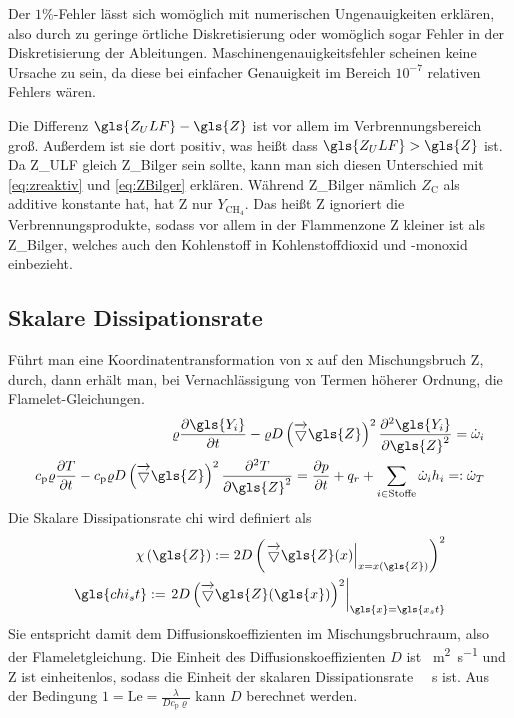 Der $1\%$-Fehler lässt sich womöglich mit numerischen Ungenauigkeiten erklären, also durch zu geringe örtliche Diskretisierung oder womöglich sogar Fehler in der Diskretisierung der Ableitungen. Maschinengenauigkeitsfehler scheinen keine Ursache zu sein, da diese bei einfacher Genauigkeit im Bereich $10^{-7}$ relativen Fehlers wären.

Die Differenz $\gls{Z_ULF} - \gls{Z}$ ist vor allem im Verbrennungsbereich groß. Außerdem ist sie dort positiv, was heißt dass $\gls{Z_ULF} > \gls{Z}$ ist. Da \gls{Z_ULF} gleich \gls{Z_Bilger} sein sollte, kann man sich diesen Unterschied mit \autoref{eq:zreaktiv} und \autoref{eq:ZBilger} erklären. Während \gls{Z_Bilger} nämlich $Z_\mathrm{C}$ als additive konstante hat, hat \gls{Z} nur $Y_{\mathrm{CH}_4}$. Das heißt \gls{Z} ignoriert die Verbrennungsprodukte, sodass vor allem in der Flammenzone \gls{Z} kleiner ist als \gls{Z_Bilger}, welches auch den Kohlenstoff in Kohlenstoffdioxid und -monoxid einbezieht.



\subsection{Skalare Dissipationsrate}
\label{sct:chist}

Führt man eine Koordinatentransformation von \gls{x} auf den Mischungsbruch \gls{Z}, durch, dann erhält man, bei Vernachlässigung von Termen höherer Ordnung, die Flamelet-Gleichungen\cite[16]{hasse-pdf08}\cite[94]{poinsot2005theoretical}.
\begin{align}
    \varrho \fpart{ \gls{Y_i} }{t} -
    \varrho D \left( \nabla\gls{Z} \right)^2
        \frac{ \partial^2 \gls{Y_i}  }{ \partial \gls{Z}^2 }
    = \dot{\omega}_i \\
    c_\mathrm{p} \varrho \fpart{T}{t} -
    c_\mathrm{p} \varrho D \left( \nabla \gls{Z} \right)^2
        \frac{ \partial^2 T }{ \partial \gls{Z}^2 }
    = \fpart{p}{t} + q_r + \sum\limits_{i \in \text{Stoffe} } \dot{\omega}_i h_i
    =: \dot{\omega}_T
\end{align}
Die Skalare Dissipationsrate \gls{chi} wird definiert als
\begin{align}
    \chi\left( \gls{Z} \right)
    := 2 D \left( \left. \nabla \gls{Z}(x) \right|_{ x = x \left( \gls{Z} \right) } \right)^2 \\
    \gls{chi_st}
    := \left.
        2 D \left( \nabla \gls{Z}( \gls{x} ) \right)^2
    \right|_{ \gls{x} = \gls{x_st} }
\end{align}
Sie entspricht damit dem Diffusionskoeffizienten im Mischungsbruchraum, also der Flameletgleichung. Die Einheit des Diffusionskoeffizienten $D$ ist \SI{}{\square\meter\per\second} und \gls{Z} ist einheitenlos, sodass die Einheit der skalaren Dissipationsrate \SI{}{\per\second} ist. Aus der Bedingung $1=\mathrm{Le}=\frac{\lambda}{D c_\mathrm{p} \varrho}$ kann $D$ berechnet werden.


